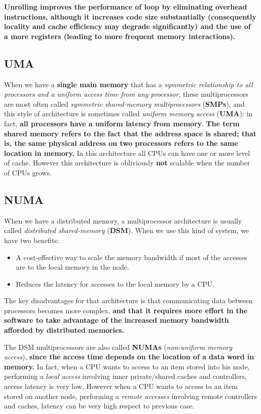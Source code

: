 \documentclass[10pt,a4paper]{article}
\begin{document}
\textbf{Unrolling improves the performance of loop by eliminating overhead instructions, although it increases code size substantially (consequently locality and cache efficiency may degrade significantly) and the use of a more registers (leading to more frequent memory interactions).}




\subsection{UMA}

When we have a \textbf{single main memory} that has a \textit{symmetric relationship to all processors and a uniform access time from any processor}, these multiprocessors are most often called \textit{symmetric shared-memory multiprocessors} (\textbf{SMPs}), and this style of architecture is sometimes called \textit{uniform memory access} (\textbf{UMA}): in fact, \textbf{all processors have a uniform latency from memory}. \textbf{The term shared memory refers to the fact that the address space is shared; that is, the same physical address on two processors refers to the same location in memory.} In this architecture all CPUs can have one or more level of cache. However this architecture is obliviously \textbf{not} scalable when the number of CPUs grows.

\subsection{NUMA}

When we have a distributed memory, a multiprocessor architecture is usually called \textit{distributed shared-memory} (\textbf{DSM}). When we use this kind of system, we have two benefits:
\begin{itemize}
\item A cost-effective way to scale the memory bandwidth if most of the accesses are to the local memory in the node.
\item Reduces the latency for accesses to the local memory by a CPU.
\end{itemize}

The key disadvantages for that architecture is that communicating data between processors becomes more complex, \textbf{and that it requires more effort in the software to take advantage of the increased memory bandwidth afforded by distributed memories.}

The DSM multiprocessors are also called \textbf{NUMAs} (\textit{non-uniform memory access}), \textbf{since the access time depends on the location of a data word in memory.} In fact, when a CPU wants to access to an item stored into his node, performing a \textit{local access} involving inner private/shared caches and controllers, access latency is very low. However when a CPU wants to access to an item stored on another node, performing a \textit{remote accesses} involving remote controllers and caches, latency can be very high respect to previous case.
\end{document}
